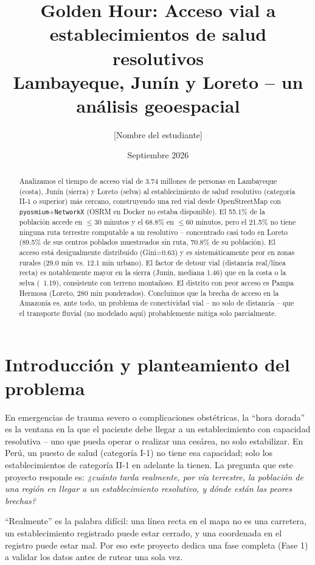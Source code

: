 \documentclass[11pt,a4paper]{article}
\title{Golden Hour: Acceso vial a establecimientos de salud resolutivos\\
\large Lambayeque, Junín y Loreto -- un análisis geoespacial}
\author{[Nombre del estudiante]}
\date{Septiembre 2026}
\begin{document}
\maketitle

\begin{abstract}
Analizamos el tiempo de acceso vial de 3.74 millones de personas en
Lambayeque (costa), Junín (sierra) y Loreto (selva) al establecimiento de
salud resolutivo (categoría II-1 o superior) más cercano, construyendo una
red vial desde OpenStreetMap con \texttt{pyosmium}+\texttt{NetworkX} (OSRM
en Docker no estaba disponible). El 55.1\% de la población accede en
$\leq$30 minutos y el 68.8\% en $\leq$60 minutos, pero el 21.5\% no tiene
ninguna ruta terrestre computable a un resolutivo -- concentrado casi todo
en Loreto (89.5\% de sus centros poblados muestreados sin ruta, 70.8\% de
su población). El acceso está desigualmente distribuido (Gini=0.63) y es
sistemáticamente peor en zonas rurales (29.0 min vs. 12.1 min urbano). El
factor de detour vial (distancia real/línea recta) es notablemente mayor en
la sierra (Junín, mediana 1.46) que en la costa o la selva (~1.19),
consistente con terreno montañoso. El distrito con peor acceso es Pampa
Hermosa (Loreto, 280 min ponderados). Concluimos que la brecha de acceso en
la Amazonía es, ante todo, un problema de conectividad vial -- no solo de
distancia -- que el transporte fluvial (no modelado aquí) probablemente
mitiga solo parcialmente.
\end{abstract}

\section{Introducción y planteamiento del problema}

En emergencias de trauma severo o complicaciones obstétricas, la ``hora
dorada'' es la ventana en la que el paciente debe llegar a un
establecimiento con capacidad resolutiva -- uno que pueda operar o realizar
una cesárea, no solo estabilizar. En Perú, un puesto de salud (categoría
I-1) no tiene esa capacidad; solo los establecimientos de categoría II-1 en
adelante la tienen. La pregunta que este proyecto responde es: \emph{¿cuánto
tarda realmente, por vía terrestre, la población de una región en llegar a
un establecimiento resolutivo, y dónde están las peores brechas?}

``Realmente'' es la palabra difícil: una línea recta en el mapa no es una
carretera, un establecimiento registrado puede estar cerrado, y una
coordenada en el registro puede estar mal. Por eso este proyecto dedica una
fase completa (Fase 1) a validar los datos antes de rutear una sola vez.
\end{document}

